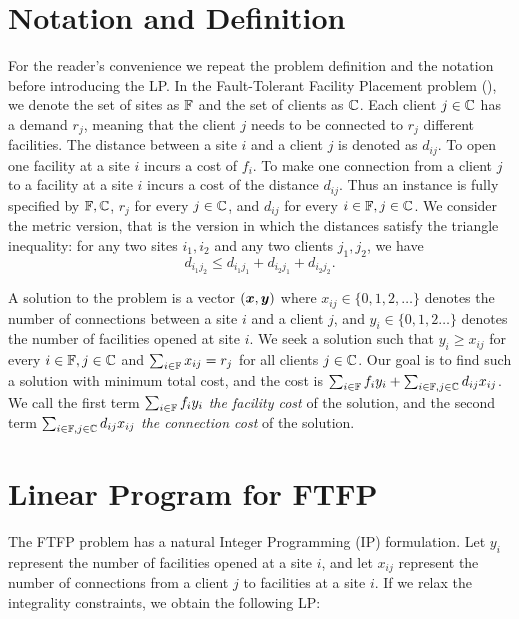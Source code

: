 \documentclass[oneside,final]{ucr}
\begin{document}
\section{Notation and Definition}
For the reader's convenience we repeat the problem
definition and the notation before introducing the LP. In
the Fault-Tolerant Facility Placement problem ({\FTFP}), we
denote the set of sites as $\mathbb{F}$ and the set of
clients as $\mathbb{C}$. Each client $j \in \mathbb{C}$ has
a demand $r_j$, meaning that the client $j$ needs to be
connected to $r_j$ different facilities. The distance
between a site $i$ and a client $j$ is denoted as
$d_{ij}$. To open one facility at a site $i$ incurs a cost
of $f_i$. To make one connection from a client $j$ to a
facility at a site $i$ incurs a cost of the distance
$d_{ij}$. Thus an {\FTFP} instance is fully specified by
$\mathbb{F}, \mathbb{C}$, $r_j$ for every $j\in\mathbb{C}$,
and $d_{ij}$ for every $i\in\mathbb{F},j\in\mathbb{C}$. We
consider the metric version, that is the version in which
the distances satisfy the triangle inequality: for any two
sites $i_1,i_2$ and any two clients $j_1,j_2$, we have
\begin{equation*}
  d_{i_1 j_2} \leq d_{i_1 j_1} + d_{i_2 j_1} + d_{i_2 j_2}.
\end{equation*} 

A solution to the {\FTFP} problem is a vector $(\boldsymbol{x}, \boldsymbol{y})$
where $x_{ij} \in \{0, 1, 2, \ldots\}$ denotes the number of
connections between a site $i$ and a client $j$, and $y_i
\in \{0, 1, 2\ldots\}$ denotes the number of facilities
opened at site $i$. We seek a solution such that $y_i \geq
x_{ij}$ for every $i \in \mathbb{F}, j \in \mathbb{C}$ and
$\sum_{i\in\mathbb{F}} x_{ij} = r_j$ for all clients $j \in
\mathbb{C}$. Our goal is to find such a solution with
minimum total cost, and the cost is $\sum_{i \in \mathbb{F}}
f_i y_i + \sum_{i \in \mathbb{F}, j \in \mathbb{C}} d_{ij}
x_{ij}$. We call the first term $\sum_{i \in \mathbb{F}} f_i
y_i$ \emph{the facility cost} of the solution, and the
second term $\sum_{i \in \mathbb{F}, j \in \mathbb{C}} d_{ij}
x_{ij}$ \emph{the connection cost} of the solution.

\section{Linear Program for FTFP}
The FTFP problem has a natural Integer Programming (IP)
formulation. Let $y_i$ represent the number of facilities
opened at a site $i$, and let $x_{ij}$ represent the number
of connections from a client $j$ to facilities at a site
$i$. If we relax the integrality constraints, we obtain the
following LP:
\end{document}
